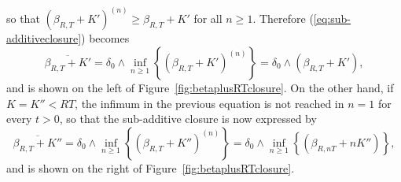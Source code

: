 %
%
so that $ (\beta_{R,T} + K')^{(n)} \geq \beta_{R,T} + K'$ for all $n \geq 1$. Therefore (\ref{eq:sub-additiveclosure})
becomes
$$ \overline{\beta_{R,T} + K' } = \delta_0 \wedge \inf_{n \geq 1} \left\{ (\beta_{R,T} + K')^{(n)} \right\} =
\delta_0 \wedge (\beta_{R,T} + K'), $$
and is shown on the left of Figure~\ref{fig:betaplusRTclosure}.
On the other hand, if $K = K'' < RT$, the infimum in the previous equation is not reached in $n = 1$ for every $t > 0$,
so that the sub-additive closure is now expressed by
$$ \overline{\beta_{R,T} + K'' } = \delta_0 \wedge \inf_{n \geq 1} \left\{ (\beta_{R,T} + K'')^{(n)} \right\} =
\delta_0 \wedge \inf_{n \geq 1} \left\{ (\beta_{R,nT} + nK'') \right\}, $$
and is shown on the right of Figure~\ref{fig:betaplusRTclosure}.
\begin{figure}[!htbp]
 \end{figure}

